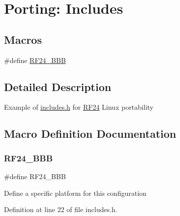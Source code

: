 \hypertarget{group__Porting__Includes}{}\section{Porting\+: Includes}
\label{group__Porting__Includes}
\subsection*{Macros}
\begin{DoxyCompactItemize}
\item 
\#define \hyperlink{group__Porting__Includes_gadee4a62e9f3f0904f4b50abf8f085280}{R\+F24\+\_\+\+B\+BB}
\end{DoxyCompactItemize}


\subsection{Detailed Description}
Example of \hyperlink{includes_8h}{includes.\+h} for \hyperlink{classRF24}{R\+F24} Linux portability 

\subsection{Macro Definition Documentation}
\mbox{\label{group__Porting__Includes_gadee4a62e9f3f0904f4b50abf8f085280}} 
\subsubsection{\texorpdfstring{R\+F24\+\_\+\+B\+BB}{RF24\_BBB}}
{\footnotesize\ttfamily \#define R\+F24\+\_\+\+B\+BB}

Define a specific platform for this configuration 

Definition at line 22 of file includes.\+h.

